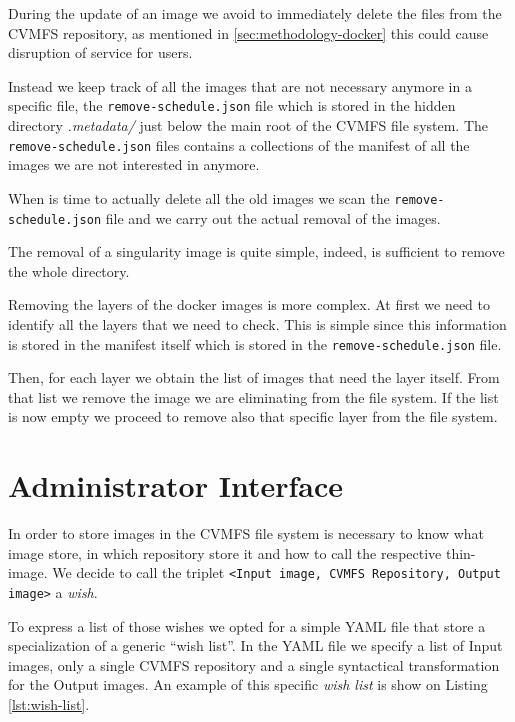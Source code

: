 During the update of an image we avoid to immediately delete the files from the
CVMFS repository, as mentioned in \ref{sec:methodology-docker} this could cause
disruption of service for users.

Instead we keep track of all the images that are not necessary anymore in a
specific file, the \texttt{remove-schedule.json} file which is stored in the
hidden directory \textit{.metadata/} just below the main root of the CVMFS file
system. The \texttt{remove-schedule.json} files contains a collections of the
manifest of all the images we are not interested in anymore.

When is time to actually delete all the old images we scan the
\texttt{remove-schedule.json} file and we carry out the actual removal of the
images. 

The removal of a singularity image is quite simple, indeed, is sufficient to
remove the whole directory.

Removing the layers of the docker images is more complex. At first we need to
identify all the layers that we need to check. This is simple since this
information is stored in the manifest itself which is stored in the
\texttt{remove-schedule.json} file.

Then, for each layer we obtain the list of images that need the layer itself.
From that list we remove the image we are eliminating from the file system. If
the list is now empty we proceed to remove also that specific layer from the
file system.

\section{Administrator Interface}

In order to store images in the CVMFS file system is necessary to know what
image store, in which repository store it and how to call the respective
thin-image. We decide to call the triplet \texttt{<Input image, CVMFS
Repository, Output image>} a \textit{wish}.

To express a list of those wishes we opted for a simple YAML file that store a
specialization of a generic “wish list”. In the YAML file we specify a list of
Input images, only a single CVMFS repository and a single syntactical
transformation for the Output images. An example of this specific \textit{wish
list} is show on Listing \ref{lst:wish-list}.

